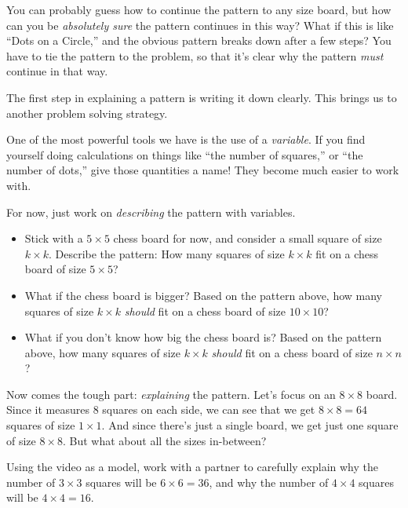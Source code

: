 You can probably guess how to continue the pattern to any size board, but  how can you be \emph{absolutely sure} the pattern continues in this way?  What if this is like ``Dots on a Circle,'' and the obvious pattern breaks down after a few steps? You have to tie the pattern to the problem, so that it's clear why the pattern \emph{must} continue in that way.

The first step in explaining a pattern is writing it down clearly.  This brings us to another problem solving strategy.

\begin{ps}
One of the most powerful tools we have   is the use of a \emph{variable}.  If you find yourself doing calculations on things like ``the number of squares,'' or ``the number of dots,'' give those quantities a name!  They become much easier to work with.
\end{ps}

\begin{thinkpair*}
For now, just work on \emph{describing} the pattern with variables.  
\begin{itemize}
\item
Stick with a $5 \times 5 $ chess board for now, and consider a small square of size $k \times k$.  Describe the pattern: How many squares of size $k \times k$ fit on a chess board of size $5\times 5$?
\item
What if the chess board is bigger?  Based on the pattern above,  how many squares of size $k \times k$ \emph{should} fit on a chess board of size $10 \times 10$?
\item
What if you don't know how big the chess board is?  Based on the pattern above,  how many squares of size $k \times k$ \emph{should} fit on a chess board of size $n \times n$?
\end{itemize}
\end{thinkpair*}

Now comes the tough part: \emph{explaining} the pattern.  Let's focus on an $8 \times 8$ board.  Since it measures $8$ squares on each side, we can see that we get $8 \times 8 = 64$ squares of size $1 \times 1$.  And since there's just a single board, we get just one square of size $8 \times 8$.  But what about all the sizes in-between?


\begin{thinkpair*}
Using the video as a model, work with a partner to carefully explain why the number of $3 \times 3$ squares will be $6 \times 6 = 36$, and why the number of $4 \times 4$ squares will be $4 \times 4 = 16$.
\end{thinkpair*} 

